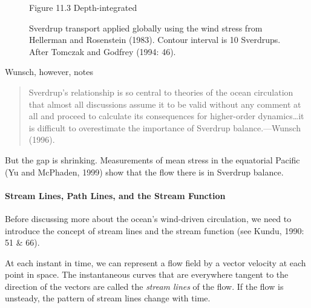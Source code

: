 \begin{enumerate}
\begin{figure}[t!]
\footnotesize
Figure 11.3 Depth-integrated \rule{0mm}{3ex}Sverdrup transport
 applied globally using the wind
stress from Hellerman and
Rosenstein (1983). Contour interval is 10 Sverdrups. After Tomczak and
Godfrey (1994: 46).
\label{fig:sverdrupxport}
\vspace{-4ex}
\end{figure}

Wunsch, however, notes
\begin{quote} \small
Sverdrup's relationship is so central to theories of the ocean
circulation that almost all discussions assume it to be valid without
any comment at all and proceed to calculate its consequences for
higher-order dynamics\dots it is difficult to overestimate the
importance of Sverdrup balance.---Wunsch (1996).
\end{quote}
But the gap is shrinking. Measurements of mean stress in the
equatorial Pacific (Yu and McPhaden, 1999) show that the flow there is
in Sverdrup balance.
\end{enumerate}

\vspace{-2ex}
\paragraph{Stream Lines, Path Lines, and the Stream Function}
Before discussing more about the ocean's wind-driven circulation, we
need to introduce the concept of stream lines and the stream function
(see Kundu, 1990: 51 \& 66).

At each instant in time, we can represent a flow field by a vector
velocity at each point in space. The instantaneous curves that are
everywhere tangent to the direction of the vectors are called the
\textit{stream lines} of the flow. If the
flow is unsteady, the pattern of stream lines change with time.

